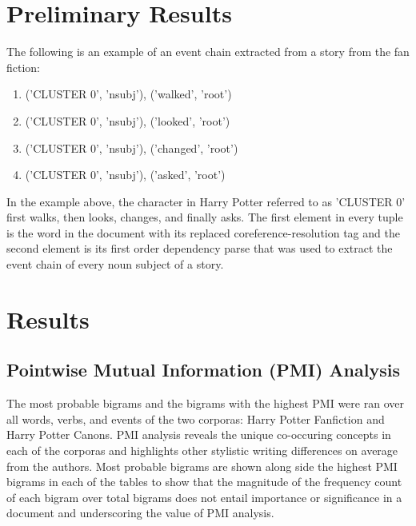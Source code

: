 \section{Preliminary Results}
The following is an example of an event chain extracted from a story from the fan fiction:
\begin{enumerate}
    \item ('CLUSTER 0', 'nsubj'), ('walked', 'root')
    \item ('CLUSTER 0', 'nsubj'), ('looked', 'root')
    \item ('CLUSTER 0', 'nsubj'), ('changed', 'root') 
    \item ('CLUSTER 0', 'nsubj'), ('asked', 'root')
\end{enumerate}
In the example above, the character in Harry Potter referred to as 'CLUSTER 0' first walks, then looks, changes, and finally asks.  The first element in every tuple is the word in the document with its replaced coreference-resolution tag and the second element is its first order dependency parse that was used to extract the event chain of every noun subject of a story.   

\section{Results}
\subsection{Pointwise Mutual Information (PMI) Analysis}
The most probable bigrams and the bigrams with the highest PMI were ran over all words, verbs, and events of the two corporas: Harry Potter Fanfiction and Harry Potter Canons. PMI analysis reveals the unique co-occuring concepts in each of the corporas and highlights other stylistic writing differences on average from the authors.  Most probable bigrams are shown along side the highest PMI bigrams in each of the tables to show that the magnitude of the frequency count of each bigram over total bigrams does not entail importance or significance in a document and underscoring the value of PMI analysis.

